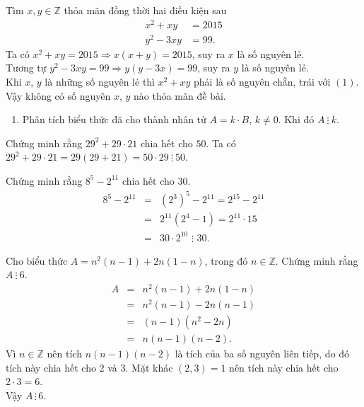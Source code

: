 \begin{vd}
	Tìm $x,y \in \mathbb{Z}$ thỏa mãn đồng thời hai điều kiện sau
\begin{align}
x^2+xy&=2015 \tag{1}\\
y^2-3xy&=99. \tag{2}
\end{align}
	\loigiai
	{
	Ta có $x^2+xy=2015 \Rightarrow x(x+y)=2015$, suy ra $x$ là số nguyên lẻ.\\
	Tương tự $y^2-3xy=99 \Rightarrow y(y-3x)=99$, suy ra $y$ là số nguyên lẻ.\\
	Khi $x$, $y$ là những số nguyên lẻ thì $x^2 +xy$ phải là số nguyên chẵn, trái với $(1)$. Vậy không có số nguyên $x$, $y$ nào thỏa mãn đề bài.
	}
\end{vd}

\begin{dang}
	\begin{enumerate}[\tickEX]
		\item Phân tích biểu thức đã cho thành nhân tử $A=k \cdot B$, $k \ne 0$. Khi đó $A \ \vdots \ k $.
	\end{enumerate}
\end{dang}

\begin{vd}
	Chứng minh rằng $29^2 +29 \cdot 21$ chia hết cho $50$.
	\loigiai
	{
		Ta có $29^2 +29 \cdot 21=29(29+21)=50 \cdot 29 \ \vdots \ 50$.
	}
\end{vd}

\begin{vd}
	Chứng minh rằng $8^5 -2^{11}$ chia hết cho $30$.
	\loigiai
	{
		{\allowdisplaybreaks\begin{eqnarray*}
			8^5 -2^{11} &=& \left(2^3 \right)^5 -2^{11}=2^{15}-2^{11}\\
			&=& 2^{11} \left(2^4-1 \right) =2^{11} \cdot 15 \\
			&=& 30 \cdot 2^{10} \, \, \vdots \, \, 30.
		\end{eqnarray*}}
	}
\end{vd}

\begin{vd}
	Cho biểu thức $A=n^2(n-1)+2n(1-n)$, trong đó $n \in \mathbb{Z}$. Chứng minh rằng $A \ \vdots \ 6$.
	\loigiai
	{
		{\allowdisplaybreaks\begin{eqnarray*}
			A &=& n^2(n-1)+2n(1-n)\\
			&=& n^2(n-1) -2n(n-1)\\
			&=& (n-1)(n^2-2n)\\
			&=&n(n-1)(n-2).
		\end{eqnarray*}}Vì $n \in \mathbb{Z}$ nên tích $n(n-1)(n-2)$ là tích của ba số nguyên liên tiếp, do đó tích này chia hết cho $2$ và $3$. Mặt khác $(2,3)=1$ nên tích này chia hết cho $2 \cdot 3 =6$. \\
	Vậy $A \, \vdots \, 6$.
	}
\end{vd}

